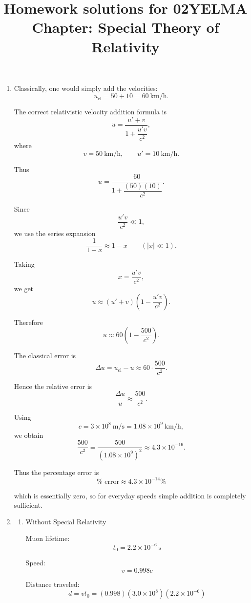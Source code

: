 \documentclass[12pt]{article}
\title{Homework solutions for 02YELMA \\ Chapter: Special Theory of Relativity}
\begin{document}
\date{}
\maketitle
\vspace{-0.8in}

\begin{enumerate}

\item

Classically, one would simply add the velocities:
\[
u_{\text{cl}} = 50+10 = 60\ \text{km/h}.
\]

The correct relativistic velocity addition formula is
\[
u=\frac{u'+v}{1+\dfrac{u'v}{c^2}},
\]
where
\[
v=50\ \text{km/h},\qquad
u'=10\ \text{km/h}.
\]

Thus
\[
u=
\frac{60}{1+\dfrac{(50)(10)}{c^2}}.
\]

Since
\[
\frac{u'v}{c^2}\ll 1,
\]
we use the series expansion
\[
\frac{1}{1+x}\approx 1-x
\qquad (|x|\ll1).
\]

Taking
\[
x=\frac{u'v}{c^2},
\]
we get
\[
u\approx (u'+v)\left(1-\frac{u'v}{c^2}\right).
\]

Therefore
\[
u\approx
60\left(1-\frac{500}{c^2}\right).
\]

The classical error is
\[
\Delta u
=
u_{\text{cl}}-u
\approx
60\cdot\frac{500}{c^2}.
\]

Hence the relative error is
\[
\frac{\Delta u}{u}
\approx
\frac{500}{c^2}.
\]

Using
\[
c=3\times10^8\ \text{m/s}
=
1.08\times10^9\ \text{km/h},
\]
we obtain
\[
\frac{500}{c^2}
=
\frac{500}{(1.08\times10^9)^2}
\approx
4.3\times10^{-16}.
\]

Thus the percentage error is
\[
\boxed{
\%\text{ error}
\approx
4.3\times10^{-14}\%
}
\]

which is essentially zero, so for everyday speeds simple addition is completely sufficient.
\vspace{1em}

\item

\begin{enumerate}

\item[(a)] Without Special Relativity

Muon lifetime:
\[
t_0=2.2\times10^{-6}\ \text{s}
\]

Speed:
\[
v=0.998c
\]

Distance traveled:
\[
d=vt_0=(0.998)(3.0\times10^8)(2.2\times10^{-6})
\]


\end{enumerate}
\end{enumerate}
\end{document}
